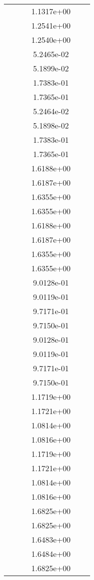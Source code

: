 \begin{xltabular}{\textwidth}{r|rS[table-format=1.3e+2]S[table-format=1.4e+2]S[table-format=1.4e+2]S[table-format=-1.5]}
&  &  & 1.1317e+00 & & \\
&  &  & 1.2541e+00 & & \\
&  &  & 1.2540e+00 & & \\
&  &  & 5.2465e-02 & & \\
&  &  & 5.1899e-02 & & \\
&  &  & 1.7383e-01 & & \\
&  &  & 1.7365e-01 & & \\
&  &  & 5.2464e-02 & & \\
&  &  & 5.1898e-02 & & \\
&  &  & 1.7383e-01 & & \\
&  &  & 1.7365e-01 & & \\
&  &  & 1.6188e+00 & & \\
&  &  & 1.6187e+00 & & \\
&  &  & 1.6355e+00 & & \\
&  &  & 1.6355e+00 & & \\
&  &  & 1.6188e+00 & & \\
&  &  & 1.6187e+00 & & \\
&  &  & 1.6355e+00 & & \\
&  &  & 1.6355e+00 & & \\
&  &  & 9.0128e-01 & & \\
&  &  & 9.0119e-01 & & \\
&  &  & 9.7171e-01 & & \\
&  &  & 9.7150e-01 & & \\
&  &  & 9.0128e-01 & & \\
&  &  & 9.0119e-01 & & \\
&  &  & 9.7171e-01 & & \\
&  &  & 9.7150e-01 & & \\
&  &  & 1.1719e+00 & & \\
&  &  & 1.1721e+00 & & \\
&  &  & 1.0814e+00 & & \\
&  &  & 1.0816e+00 & & \\
&  &  & 1.1719e+00 & & \\
&  &  & 1.1721e+00 & & \\
&  &  & 1.0814e+00 & & \\
&  &  & 1.0816e+00 & & \\
&  &  & 1.6825e+00 & & \\
&  &  & 1.6825e+00 & & \\
&  &  & 1.6483e+00 & & \\
&  &  & 1.6484e+00 & & \\
&  &  & 1.6825e+00 & & \\

\end{xltabular}
